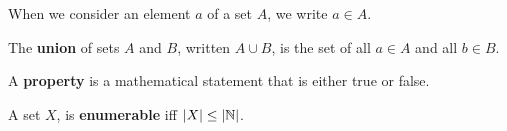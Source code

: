 \begin{notation} When we consider an element $a$ of a set $A$, we write $a\in
A$. \end{notation}

\begin{definition} The \textbf{union} of sets $A$ and $B$, written $A\cup B$,
is the set of all $a\in A$ and all $b\in B$. \end{definition}

\begin{specification} A \textbf{property} is a mathematical statement that is
either true or false. \end{specification}

\begin{definition} A set $X$, is \textbf{enumerable} iff
$\mathopen{}\left|{X}\right|\mathclose{}\leq\mathopen{}\left|{\mathbb{N}}\right|\mathclose{}$. \end{definition}















